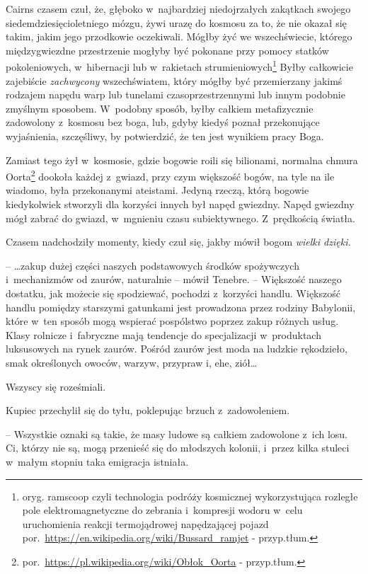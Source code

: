 \documentclass[oneside,polish,12pt,sfheadings]{mwbk}
\begin{document}
Cairns czasem czuł, że, głęboko w~najbardziej niedojrzałych zakątkach
swojego siedemdziesięcioletniego mózgu, żywi urazę do kosmosu za to, że
nie okazał się takim, jakim jego przodkowie oczekiwali. Mógłby żyć we
wszechświecie, którego międzygwiezdne przestrzenie mogłyby być pokonane
przy pomocy statków pokoleniowych, w~hibernacji lub w~rakietach
strumieniowych\footnote{oryg. ramscoop czyli technologia
podróży kosmicznej wykorzystująca rozległe pole elektromagnetyczne do
zebrania i~kompresji wodoru w~celu uruchomienia reakcji termojądrowej
napędzającej pojazd por.~\url{https://en.wikipedia.org/wiki/Bussard_ramjet} - przyp.tłum.} Byłby całkowicie zajebiście
\emph{zachwycony } wszechświatem, który mógłby być przemierzany jakimś
rodzajem napędu warp lub tunelami czasoprzestrzennymi lub innym podobnie
zmyślnym sposobem. W~podobny sposób, byłby całkiem metafizycznie
zadowolony z~kosmosu bez boga, lub, gdyby kiedyś poznał przekonujące
wyjaśnienia, szczęśliwy, by potwierdzić, że ten jest wynikiem pracy
Boga.

Zamiast tego żył w~kosmosie, gdzie bogowie roili się bilionami, normalna
chmura Oorta\footnote{ por.~\url{https://pl.wikipedia.org/wiki/Obłok_Oorta} - przyp.tłum.} dookoła każdej z~gwiazd, przy czym większość bogów, na tyle
na ile wiadomo, była przekonanymi ateistami. Jedyną rzeczą, którą
bogowie kiedykolwiek stworzyli dla korzyści innych był napęd gwiezdny.
Napęd gwiezdny mógł zabrać do gwiazd, w~mgnieniu czasu subiektywnego. Z~prędkością światła.

Czasem nadchodziły momenty, kiedy czuł się, jakby mówił bogom
\emph{wielki dzięki.}

-- \ldots zakup dużej części naszych podstawowych środków spożywczych i~mechanizmów od zaurów, naturalnie -- mówił Tenebre. -- Większość naszego
dostatku, jak możecie się spodziewać, pochodzi z~korzyści handlu.
Większość handlu pomiędzy starszymi gatunkami jest prowadzona przez
rodziny Babylonii, które w~ten sposób mogą wspierać pospólstwo poprzez
zakup różnych usług. Klasy rolnicze i~fabryczne mają tendencje do
specjalizacji w~produktach luksusowych na rynek zaurów. Pośród zaurów
jest moda na ludzkie rękodzieło, smak określonych owoców, warzyw,
przypraw i, ehe, ziół\ldots

Wszyscy się roześmiali.

Kupiec przechylił się do tyłu, poklepując brzuch z~zadowoleniem. 

-- Wszystkie oznaki są takie, że masy ludowe są całkiem zadowolone z~ich
losu. Ci, którzy nie są, mogą przenieść się do młodszych kolonii, i~przez kilka stuleci w~małym stopniu taka emigracja istniała.
\end{document}
